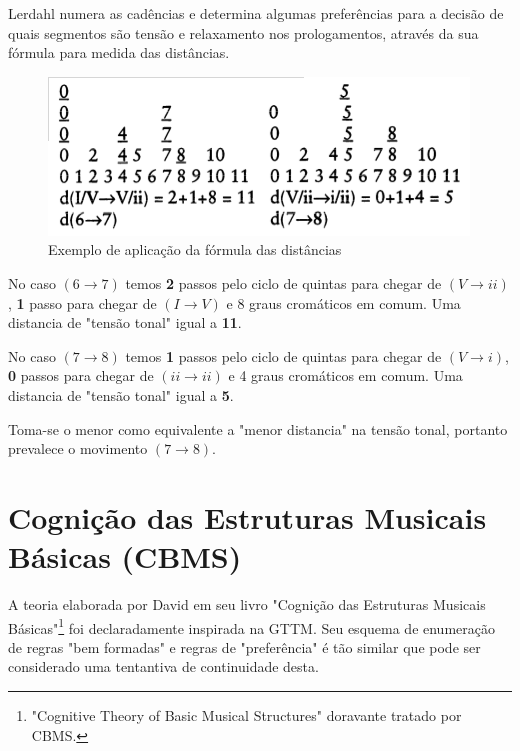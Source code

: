 \documentclass[
	12pt,				%
	openright,			%
	twoside,			%
	a4paper,			%
	english,			%
	french,				%
	spanish,			%
	brazil				%
	]{abntex2}
\begin{document}
Lerdahl numera as cadências e determina algumas preferências para a decisão de quais segmentos são tensão e relaxamento nos prologamentos, através da sua fórmula para medida das distâncias.

\begin{figure}[!h]
	\caption{\label{fig_grafico}Exemplo de aplicação da fórmula das distâncias }
	\begin{center}
	    \includegraphics[scale=0.7]{lerdahl/pitchspace-K282.png}
	\end{center}
\end{figure}



No caso $(6 \to 7)$ temos \textbf{2} passos pelo ciclo de quintas para chegar de $(V \to ii)$, \textbf{1} passo para chegar de $(I \to V)$ e 8 graus cromáticos em comum. Uma distancia de "tensão tonal" igual a \textbf{11}.\pagebreak

No caso $(7 \to 8)$ temos \textbf{1} passos pelo ciclo de quintas para chegar de $(V \to i)$, \textbf{0} passos para chegar de $(ii \to ii)$ e 4 graus cromáticos em comum. Uma distancia de "tensão tonal" igual a \textbf{5}.

Toma-se o menor como equivalente a "menor distancia" na tensão tonal, portanto prevalece o movimento $(7 \to 8)$. 



\section{Cognição das Estruturas Musicais Básicas (CBMS)}

A teoria elaborada por David  em seu livro "Cognição das Estruturas Musicais Básicas"\footnote{"Cognitive Theory of Basic Musical Structures" doravante tratado por CBMS. } foi declaradamente inspirada na GTTM. Seu esquema de enumeração de regras "bem formadas" e regras de "preferência" é tão similar que pode ser considerado uma tentantiva de continuidade desta.
\end{document}

